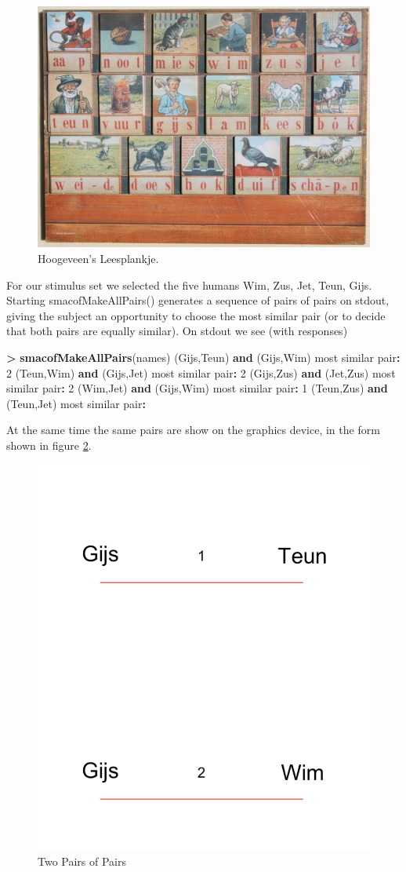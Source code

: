 \documentclass[
  12pt,
]{article}
\newenvironment{Shaded}{\begin{snugshade}}{\end{snugshade}}
\newcommand{\DecValTok}[1]{\textcolor[rgb]{0.00,0.00,0.81}{#1}}
\newcommand{\FunctionTok}[1]{\textcolor[rgb]{0.13,0.29,0.53}{\textbf{#1}}}
\newcommand{\NormalTok}[1]{#1}
\newcommand{\SpecialCharTok}[1]{\textcolor[rgb]{0.81,0.36,0.00}{\textbf{#1}}}
\begin{document}
\begin{figure}

{\centering \includegraphics[width=0.5\linewidth]{graphics/leesplankje} 

}

\caption{Hoogeveen's Leesplankje.}\label{fig:hoogeveenjpg}
\end{figure}

For our stimulus set we selected the five humans Wim, Zus, Jet, Teun, Gijs.
Starting smacofMakeAllPairs() generates a sequence of pairs of pairs on stdout,
giving the subject an opportunity to choose the most similar pair (or to
decide that both pairs are equally similar). On stdout we see (with responses)

\begin{Shaded}
\begin{Highlighting}[]
\SpecialCharTok{\textgreater{}} \FunctionTok{smacofMakeAllPairs}\NormalTok{(names)}
\NormalTok{(Gijs,Teun) }\FunctionTok{and}\NormalTok{ (Gijs,Wim)}
\NormalTok{most similar pair}\SpecialCharTok{:} \DecValTok{2}
\NormalTok{(Teun,Wim) }\FunctionTok{and}\NormalTok{ (Gijs,Jet)}
\NormalTok{most similar pair}\SpecialCharTok{:} \DecValTok{2}
\NormalTok{(Gijs,Zus) }\FunctionTok{and}\NormalTok{ (Jet,Zus)}
\NormalTok{most similar pair}\SpecialCharTok{:} \DecValTok{2}
\NormalTok{(Wim,Jet) }\FunctionTok{and}\NormalTok{ (Gijs,Wim)}
\NormalTok{most similar pair}\SpecialCharTok{:} \DecValTok{1}
\NormalTok{(Teun,Zus) }\FunctionTok{and}\NormalTok{ (Teun,Jet)}
\NormalTok{most similar pair}\SpecialCharTok{:}
\end{Highlighting}
\end{Shaded}

At the same time the same pairs are show on the graphics device, in the form shown in figure \ref{fig:hoogeveenpng}.

\begin{figure}

{\centering \includegraphics[width=0.3\linewidth]{graphics/hoogeveen} 

}

\caption{Two Pairs of Pairs}\label{fig:hoogeveenpng}
\end{figure}
\end{document}
